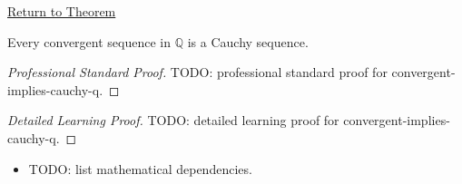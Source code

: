 \newpage
{}
\label{prf:convergent-implies-cauchy-q}

\begin{remark*}[Return]
\hyperref[thm:convergent-implies-cauchy-q]{Return to Theorem}
\end{remark*}

\begin{theorem*}
Every convergent sequence in $\mathbb{Q}$ is a Cauchy sequence.
\end{theorem*}

\begin{proof}[Professional Standard Proof]
\LRAProofBodyStart
TODO: professional standard proof for convergent-implies-cauchy-q.
\end{proof}

\begin{proof}[Detailed Learning Proof]
\LRAProofBodyStart
TODO: detailed learning proof for convergent-implies-cauchy-q.
\end{proof}

\begin{remark*}
\end{remark*}

\begin{dependencies}
\begin{itemize}
  \item TODO: list mathematical dependencies.
\end{itemize}
\end{dependencies}

\clearpage
